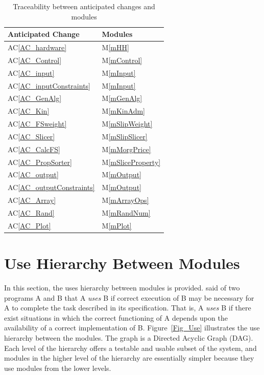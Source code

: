 \documentclass[12pt, titlepage]{article}
\newcommand{\acref}[1]{AC\ref{#1}}
\newcommand{\mref}[1]{M\ref{#1}}
\begin{document}
\begin{table}[h!]
\centering
\begin{tabular}{ll}
\toprule
\textbf{Anticipated Change} & \textbf{Modules}\\
\midrule
\acref{AC_hardware} & \mref{mHH}\\
\acref{AC_Control} & \mref{mControl}\\
\acref{AC_input} & \mref{mInput}\\
\acref{AC_inputConstraints} & \mref{mInput}\\
\acref{AC_GenAlg}& \mref{mGenAlg}\\
\acref{AC_Kin}& \mref{mKinAdm}\\
\acref{AC_FSweight}& \mref{mSlipWeight}\\
\acref{AC_Slicer} & \mref{mSlipSlicer}\\
\acref{AC_CalcFS} & \mref{mMorgPrice}\\
\acref{AC_PropSorter}& \mref{mSliceProperty}\\
\acref{AC_output}& \mref{mOutput}\\
\acref{AC_outputConstraints}& \mref{mOutput}\\
\acref{AC_Array} & \mref{mArrayOps}\\
\acref{AC_Rand} & \mref{mRandNum}\\
\acref{AC_Plot} & \mref{mPlot}\\
\bottomrule
\end{tabular}
\caption{Traceability between anticipated changes and modules}
\label{Table:AC}
\end{table}

\section{Use Hierarchy Between Modules} \label{SecUse}

\hspace{3ex}In this section, the uses hierarchy between modules is
provided. \cite{Parnas1978} said of two programs A and B that A {\em
  uses} B if correct execution of B may be necessary for A to complete
the task described in its specification. That is, A {\em uses} B if
there exist situations in which the correct functioning of A depends
upon the availability of a correct implementation of B. 
Figure~\ref{Fig_Use} illustrates the use hierarchy between the modules. The
graph is a Directed Acyclic Graph (DAG). Each level of the hierarchy
offers a testable and usable subset of the system, and modules in the
higher level of the hierarchy are essentially simpler because they use
modules from the lower levels.
\end{document}
